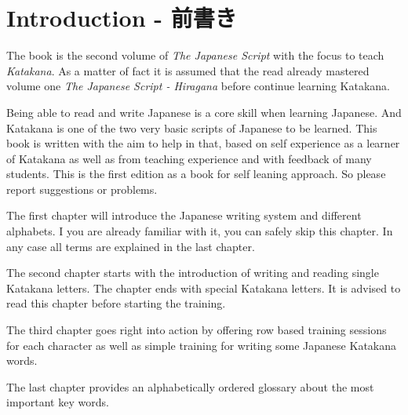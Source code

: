 \chapter*{Introduction - 前書き}

The book is the second volume of \textit{The Japanese Script} with the focus to
teach \textit{Katakana}. As a matter of fact it is assumed that the read
already mastered volume one \textit{The Japanese Script - Hiragana} before
continue learning Katakana. 

Being able to read and write Japanese is a core skill when learning Japanese.
And Katakana is one of the two very basic scripts of Japanese to be learned.
This book is written with the aim to help in that, based on self experience as
a learner of Katakana as well as from teaching experience and with feedback of
many students. This is the first edition as a book for self leaning approach.
So please report suggestions or problems. 

The first chapter will introduce the Japanese writing system and different
alphabets. I you are already familiar with it, you can safely skip this
chapter. In any case all terms are explained in the last chapter.

The second chapter starts with the introduction of writing and reading single
Katakana letters. The chapter ends with special Katakana letters. It is advised
to read this chapter before starting the training. 

The third chapter goes right into action by offering row based training
sessions for each character as well as simple training for writing some
Japanese Katakana words.

The last chapter provides an alphabetically ordered glossary about the most
important key words.
